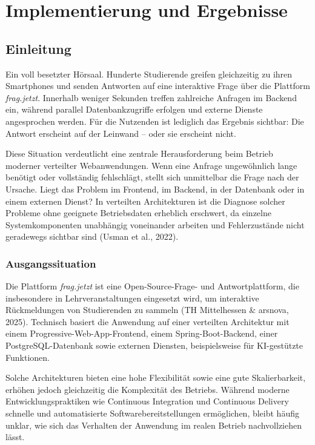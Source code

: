 
\chapter{Implementierung und Ergebnisse}
%
%
%
\label{ch:realisierung}

\section{Einleitung}

Ein voll besetzter Hörsaal. Hunderte Studierende greifen gleichzeitig zu ihren Smartphones und senden Antworten auf eine interaktive Frage über die Plattform \emph{frag.jetzt}. Innerhalb weniger Sekunden treffen zahlreiche Anfragen im Backend ein, während parallel Datenbankzugriffe erfolgen und externe Dienste angesprochen werden. Für die Nutzenden ist lediglich das Ergebnis sichtbar: Die Antwort erscheint auf der Leinwand – oder sie erscheint nicht.

Diese Situation verdeutlicht eine zentrale Herausforderung beim Betrieb moderner verteilter Webanwendungen. Wenn eine Anfrage ungewöhnlich lange benötigt oder vollständig fehlschlägt, stellt sich unmittelbar die Frage nach der Ursache. Liegt das Problem im Frontend, im Backend, in der Datenbank oder in einem externen Dienst? In verteilten Architekturen ist die Diagnose solcher Probleme ohne geeignete Betriebsdaten erheblich erschwert, da einzelne Systemkomponenten unabhängig voneinander arbeiten und Fehlerzustände nicht geradewegs sichtbar sind (Usman et al., 2022).

\subsection{Ausgangssituation}

Die Plattform \emph{frag.jetzt} ist eine Open-Source-Frage- und Antwortplattform, die insbesondere in Lehrveranstaltungen eingesetzt wird, um interaktive Rückmeldungen von Studierenden zu sammeln (TH Mittelhessen \& arsnova, 2025). Technisch basiert die Anwendung auf einer verteilten Architektur mit einem Progressive-Web-App-Frontend, einem Spring-Boot-Backend, einer PostgreSQL-Datenbank sowie externen Diensten, beispielsweise für KI-gestützte Funktionen.

Solche Architekturen bieten eine hohe Flexibilität sowie eine gute Skalierbarkeit, erhöhen jedoch gleichzeitig die Komplexität des Betriebs. Während moderne Entwicklungspraktiken wie Continuous Integration und Continuous Delivery schnelle und automatisierte Softwarebereitstellungen ermöglichen, bleibt häufig unklar, wie sich das Verhalten der Anwendung im realen Betrieb nachvollziehen lässt.

